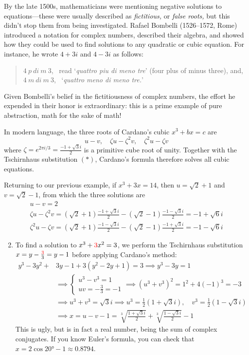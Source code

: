 
By the late 1500s, mathematicians were mentioning negative solutions to equations---these were usually described as \emph{fictitious,} or \emph{false roots,} but this didn't stop them from being investigated. Rafael Bombelli (1526--1572, Rome) introduced a notation for complex numbers, described their algebra, and showed how they could be used to find solutions to any quadratic or cubic equation. For instance, he wrote $4+3i$ and $4-3i$ as follows:
\begin{quote}
	$4\ p\ di\ m\ 3$, \ read `\emph{quattro piu di meno tre}' (four plus of minus three), and,\\
	$4\ m\ di\ m\ 3$, \ `\emph{quattro meno di meno tre.}'
\end{quote}
Given Bombelli's belief in the fictitiousness of complex numbers, the effort he expended in their honor is extraordinary: this is a prime example of pure abstraction, math for the sake of math!\medbreak

In modern language, the three roots of Cardano's cubic $x^3+bx=c$ are
\[
	u-v,\quad \zeta u-\zeta^2v,\quad \zeta^2u-\zeta v
\]
where $\zeta=e^{2\pi i/3} =\frac{-1+\sqrt 3i}2$ is a primitive cube root of unity. Together with the Tschirnhaus substitution $(\ast)$, Cardano's formula therefore solves all cubic equations.

\goodbreak



\exstart Returning to our previous example, if $x^3+3x=14$, then $u=\sqrt 2+1$ and $v=\sqrt 2-1$, from which the three solutions are
\begin{gather*}
	u-v=2\\
	\zeta u-\zeta^2v=(\sqrt 2+1)\frac{-1+\sqrt 3i}2-(\sqrt 2-1)\frac{-1-\sqrt 3i}2 =-1+\sqrt 6i\\
	\zeta^2u-\zeta v=(\sqrt 2+1)\frac{-1-\sqrt 3i}2-(\sqrt 2-1)\frac{-1+\sqrt 3i}2 =-1-\sqrt 6i
\end{gather*}

\begin{enumerate}\setcounter{enumi}{1}
  \item To find a solution to $x^3+\textcolor{red}{3}x^2=3$, we perform the Tschirnhaus substitution $x=y-\frac{\textcolor{red}{3}}3=y-1$ before applying Cardano's method:
	\begin{align*}
		y^3-3y^2+&3y-1+3(y^2-2y+1)=3\implies y^3-3y=1 \tag{$b=-3$, $c=1$}\\
		&\implies
		\begin{cases}
			u^3-v^3=1\\
			uv=-\frac 33=-1
		\end{cases}
		\implies (u^3+v^3)^2=1^2+4(-1)^3=-3\\
		&\implies u^3+v^3=\sqrt 3i \implies u^3=\frac 12(1+\sqrt 3i),\quad v^3=\frac 12(1-\sqrt 3i)\\
		&\implies x=u-v-1=\sqrt[3]{\frac{1+\sqrt 3i}2}+\sqrt[3]{\frac{1-\sqrt 3i}2}-1 
	\end{align*}
	This is ugly, but is in fact a real number, being the sum of complex conjugates. If you know Euler's formula, you can check that $x=2\cos\ang{20}-1\approx 0.8794$.
\end{enumerate}

